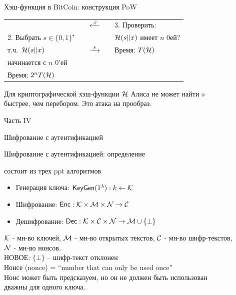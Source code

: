 \documentclass[usenames,dvipsnames,8pt,aspectratio=169]{beamer}
\begin{document}
\begin{frame}{Хэш-функция в  BitCoin: конструкция PoW}
\begin{tabular}{l c c c l}
&  & \Huge $\xleftarrow{\mkern5mu x \mkern5mu}$ & &  3. Проверить: \\ [2pt]
2. Выбрать $s \in \{0,1\}^\star$   & & &  & $\mathcal{H}(s||x)$  имеет $n$ 0ей?  \\[-6pt]
т.ч.\ $\mathcal{H}(s||x)$ & & \Huge $\xrightarrow{\mkern5mu s \mkern5mu}$  &  &  {\color{Orange}  Время: $T(\mathcal{H}) $}  \\
начинается с $n$ 0'ей & & &  &  \\[4pt]
{\color{Orange}  Время: $2^n T(\mathcal{H}) $} & & &  & 
\end{tabular}

\vspace{15pt}
Для криптографической хэш-функции $\mathcal{H}$ Алиса не может найти $s$ \\ быстрее, чем перебором. Это атака на прообраз. 
\end{frame}

\begin{frame}
	Часть IV \\ [10pt]
	\begin{LARGE}
		
		\color{Orange}
		\Huge Шифрование с аутентификацией
		
	\end{LARGE}
\end{frame}

\begin{frame}{Шифрование с аутентификацией: определение}
	\Large
	
	{\color{Orange}{Шифрование с аутентификацией (AE)}} состоит из трех ppt алгоритмов
	\begin{itemize}
		\itemsep 10pt
		\item Генерация ключа: $\textsf{KeyGen}(1^\lambda): k \leftarrow \mathcal{K}$
		\item Шифрование: $\textsf{Enc}: \mathcal{K} \times \mathcal{M} \times \mathcal{N} \rightarrow \mathcal{C}$
		\item Дешифрование:  $\textsf{Dec}: \mathcal{K} \times \mathcal{C}  \times \mathcal{N} \rightarrow \mathcal{M} \cup \{\bot\}$
	\end{itemize}
	\vspace{15pt}
	$\mathcal{K}$ - мн-во ключей, $\mathcal{M}$ - мн-во открытых текстов, $\mathcal{C}$ - мн-во шифр-текстов,  \\ $\mathcal{N}$ - мн-во {\color{Orange} нонсов}. \\[10pt]
	
	
	НОВОЕ: $\{\bot\}$ -- шифр-текст отклонен \\[10pt]
	
	
	{\color{Orange} Нонсе (nonce)} = ``number that can only be used once'' \\[5pt]
	Нонс может быть предсказуем, но он не должен быть использован \\ {\color{Orange} дважны} для одного ключа. \\[5pt]
	
\end{frame}
\end{document}
